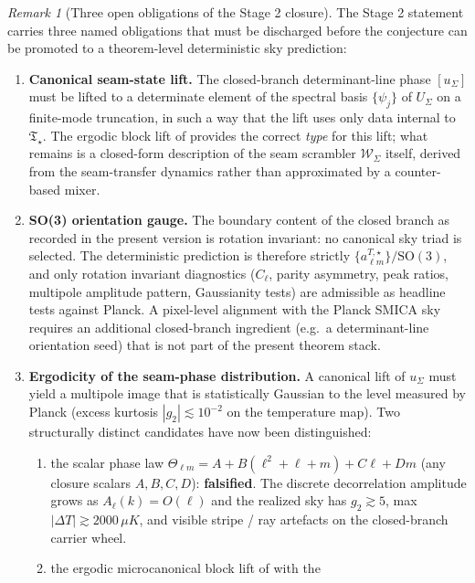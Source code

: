 \documentclass[11pt,a4paper]{article}
\theoremstyle{definition}
\theoremstyle{remark}
\newtheorem*{remark}{Remark}
\newcommand{\Tstar}{\mathfrak T_{\star}}
\begin{document}
\begin{remark}[Three open obligations of the Stage 2 closure]
\label{rem:stage2-open-obligations}
The Stage 2 statement  carries three named obligations that
must be discharged before the conjecture can be promoted to a theorem-level deterministic sky
prediction:
\begin{enumerate}[label=(O\arabic*),leftmargin=2.4em,topsep=3pt,itemsep=2pt]
\item \textbf{Canonical seam-state lift.} The closed-branch determinant-line phase $[u_\Sigma]$
must be lifted to a determinate element of the spectral basis $\{\psi_j\}$ of $U_\Sigma$ on a
finite-mode truncation, in such a way that the lift uses only data internal to $\Tstar$. The
ergodic block lift of  provides the correct \emph{type} for
this lift; what remains is a closed-form description of the seam scrambler $\mathcal W_\Sigma$
itself, derived from the seam-transfer dynamics rather than approximated by a counter-based mixer.
\item \textbf{SO(3) orientation gauge.} The boundary content of the closed branch as recorded in
the present version is rotation invariant: no canonical sky triad is selected. The deterministic
prediction is therefore strictly $\{a_{\ell m}^{T,\star}\}/\mathrm{SO}(3)$, and only rotation
invariant diagnostics
($C_\ell$, parity asymmetry, peak ratios, multipole amplitude pattern, Gaussianity tests) are
admissible as headline tests against Planck. A pixel-level alignment with the Planck SMICA sky
requires an additional closed-branch ingredient (e.g.\ a determinant-line orientation seed) that
is not part of the present theorem stack.
\item \textbf{Ergodicity of the seam-phase distribution.} A canonical lift of $u_\Sigma$ must
yield a multipole image that is statistically Gaussian to the level measured by Planck (excess
kurtosis $|g_2|\lesssim 10^{-2}$ on the temperature map). Two structurally distinct candidates
have now been distinguished:
\begin{enumerate}[label=(\alph*),leftmargin=2em,topsep=2pt,itemsep=1pt]
\item the scalar phase law $\Theta_{\ell m}=A+B(\ell^2+\ell+m)+C\ell+Dm$ (any closure scalars
$A,B,C,D$): \textbf{falsified}. The discrete decorrelation amplitude grows as $A_\ell(k)=O(\ell)$
and the realized sky has $g_2\gtrsim 5$, max $|\Delta T|\gtrsim 2000\,\mu K$, and visible
stripe / ray artefacts on the closed-branch carrier wheel.
\item the ergodic microcanonical block lift of  with the

\end{enumerate}
\end{enumerate}
\end{remark}
\end{document}
